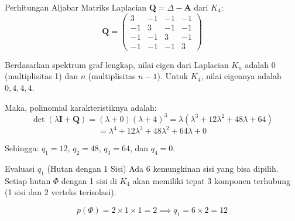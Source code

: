 \documentclass[aspectratio=169]{beamer}
\begin{document}
\begin{frame}{Perhitungan Aljabar}
  Matriks Laplacian $\mathbf{Q} = \Delta - \mathbf{A}$ dari $K_4$:
  $$
    \mathbf{Q} = \begin{pmatrix}
      3  & -1 & -1 & -1 \\
      -1 & 3  & -1 & -1 \\
      -1 & -1 & 3  & -1 \\
      -1 & -1 & -1 & 3
    \end{pmatrix}
  $$

  Berdasarkan spektrum graf lengkap, nilai eigen dari Laplacian $K_n$ adalah $0$ (multiplisitas 1) dan $n$ (multiplisitas $n-1$). Untuk $K_4$, nilai eigennya adalah $0, 4, 4, 4$.

  Maka, polinomial karakteristiknya adalah:
  $$ \det(\lambda \mathbf{I} + \mathbf{Q}) = (\lambda + 0)(\lambda + 4)^3 = \lambda(\lambda^3 + 12\lambda^2 + 48\lambda + 64) $$
  $$ = \lambda^4 + 12\lambda^3 + 48\lambda^2 + 64\lambda + 0 $$

  Sehingga: $q_1 = 12$, $q_2 = 48$, $q_3 = 64$, dan $q_4 = 0$.
\end{frame}

\begin{frame}[fragile]{Evaluasi $q_1$ (Hutan dengan 1 Sisi)}
  Ada 6 kemungkinan sisi yang bisa dipilih. Setiap hutan $\Phi$ dengan 1 sisi di $K_4$ akan memiliki tepat 3 komponen terhubung (1 sisi dan 2 verteks terisolasi).

  $$ p(\Phi) = 2 \times 1 \times 1 = 2 \implies q_1 = 6 \times 2 = 12 $$

  \begin{center}
  \end{center}
\end{frame}
\end{document}
